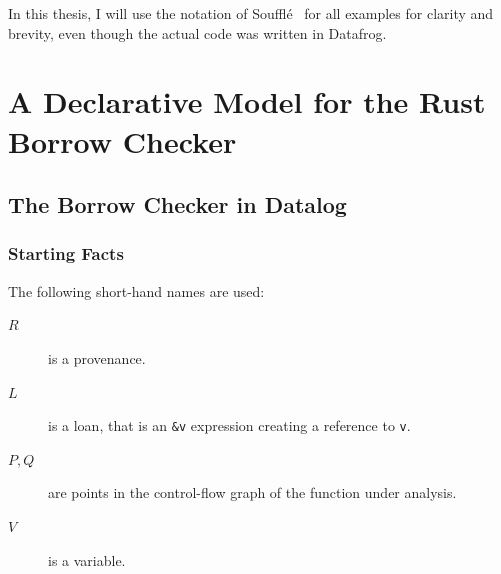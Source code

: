 \documentclass[11pt,a4paper,twoside,openany]{report}
\newcommand{\fixme}[1] {{\color{red}#1}}
\newcommand{\InRust}[1]{\texttt{#1}}
\begin{document}
In this thesis, I will use the notation of Souffl{\'e}~\cite{scholz_fast_2016}
for all examples for clarity and brevity, even though the actual code was
written in Datafrog.

\chapter{A Declarative Model for the Rust Borrow Checker}
\label{cha:investigation}

\section{The Borrow Checker in Datalog}\label{sec:borr-check-datal}

\subsection{Starting Facts}
\label{sec:input-facts}

The following short-hand names are used:
\begin{description}
\item[$R$] is a provenance.
\item[$L$] is a loan, that is an \InRust{&v} expression creating a reference
  to \InRust{v}.
\item[$P, Q$] are points in the control-flow graph of the function under analysis.
\item[$V$] is a variable.
\end{description}
\end{document}
